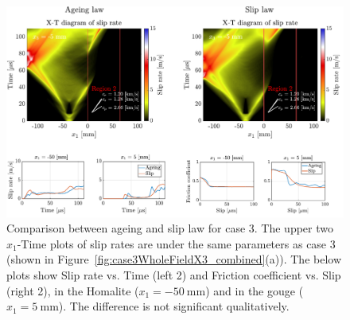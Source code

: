 \documentclass[final,a4paper]{elsarticle}
\newif\ifincludetext
\begin{document}
\ifincludetext{
To check whether using slip law for the evolution of state variable $\theta$ would give us qualitatively different results, 
we run a case with velocity-strengthening gouge plus flash heating effect, 
in which the evolution for the state variable along the fault obeys the slip law as stated in (\ref{eq:slip_law}). 
Figure~\ref{fig:SLPatchCombined} shows the $x_1$-Time diagrams of slip rate, 
as well as the evolution of slip rate vs. time and friction coefficient vs. slip, 
for ageing and slip law. 
We see that the rupture behavior is not qualitatively different, 
with both laws arresting the first rupture and the second rupture arriving from the Homalite. 
Note that under the same explosion condition, 
the case with slip law requires larger $D_{RS}$, 
as also mentioned by \cite{Yuval_2020}. 
From the Friction coefficient vs. slip plot, 
one can also verify that the two laws have similar cohesive energy (proportional to the area-under-curve), 
and thus behaves similarly under the same explosion. 
}
\fi
\begin{figure}[htbp]
    \centering
    \includegraphics[width=1.\textwidth]{figures/AgeingVsSlip_VF.pdf}
    \caption{Comparison between ageing and slip law for case 3. 
    The upper two $x_1$-Time plots of slip rates are under the same parameters as case 3 (shown in Figure~\ref{fig:case3WholeFieldX3_combined}(a)). 
    The below plots show Slip rate vs. Time (left 2) and Friction coefficient vs. Slip (right 2), 
    in the Homalite ($x_1 = -50\ \mathrm{mm}$) and in the gouge ($x_1 = 5\ \mathrm{mm}$). 
    The difference is not significant qualitatively.}
    \label{fig:AgeingVsSlipCase3}
\end{figure}
\end{document}
